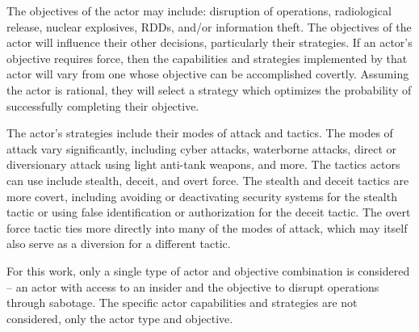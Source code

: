 The objectives of the actor may include: disruption of operations, radiological release, nuclear explosives, \glspl{RDD}, and/or information theft.
The objectives of the actor will influence their other decisions, particularly their strategies.
If an actor's objective requires force, then the capabilities and strategies implemented by that actor will vary from one whose objective can be accomplished covertly.
Assuming the actor is rational, they will select a strategy which optimizes the probability of successfully completing their objective.

The actor's strategies include their modes of attack and tactics. The modes of attack vary significantly, including cyber attacks, waterborne attacks, direct or diversionary attack using light anti-tank weapons, and more.
The tactics actors can use include stealth, deceit, and overt force.
The stealth and deceit tactics are more covert, including avoiding or deactivating security systems for the stealth tactic or using false identification or authorization for the deceit tactic.
The overt force tactic ties more directly into many of the modes of attack, which may itself also serve as a diversion for a different tactic.


For this work, only a single type of actor and objective combination is considered -- an actor with access to an insider and the objective to disrupt operations through sabotage.
The specific actor capabilities and strategies are not considered, only the actor type and objective. 
